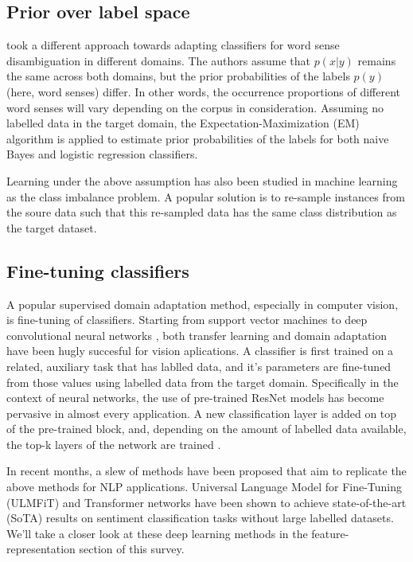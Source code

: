 \documentclass[12pt]{report}
\begin{document}
	\subsection{Prior over label space}
	\citep{chan2006estimating} took a different approach towards adapting classifiers for word sense disambiguation in different domains. The authors assume that $p(x|y)$ remains the same across both domains, but the prior probabilities of the labels $p(y)$ (here, word senses) differ. In other words, the occurrence proportions of different word senses will vary depending on the corpus in consideration. Assuming no labelled data in the target domain, the Expectation-Maximization (EM) algorithm is applied to estimate prior probabilities of the labels for both naive Bayes and logistic regression classifiers.
	\par
	Learning under the above assumption has also been studied in machine learning as the class imbalance problem. A popular solution is to re-sample instances from the soure data such that this re-sampled data has the same class distribution as the target dataset. 
	
	\subsection{Fine-tuning classifiers}  
	A popular supervised domain adaptation method, especially in computer vision, is fine-tuning of classifiers. Starting from support vector machines \citep{yang2007adapting} to deep convolutional neural networks \citep{sharif2014cnn}, both transfer learning and domain adaptation have been hugly succesful for vision aplications. A classifier is first trained on a related, auxiliary task that has lablled data, and it's parameters are fine-tuned from those values using labelled data from the target domain. Specifically in the context of neural networks, the use of pre-trained ResNet models \citep{he2016deep} has become pervasive in almost every application. A new classification layer is added on top of the pre-trained block, and, depending on the amount of labelled data available, the top-k layers of the network are trained \citep{yosinski2014transferable}.
	\par In recent months, a slew of methods have been proposed that aim to replicate the above methods for NLP applications. Universal Language Model for Fine-Tuning (ULMFiT) \citep{howard2018universal} and Transformer networks \citep{vaswani2017attention} have been shown to achieve state-of-the-art (SoTA) results on sentiment classification tasks without large labelled datasets. We'll take a closer look at these deep learning methods in the feature-representation section of this survey. 
\end{document}
